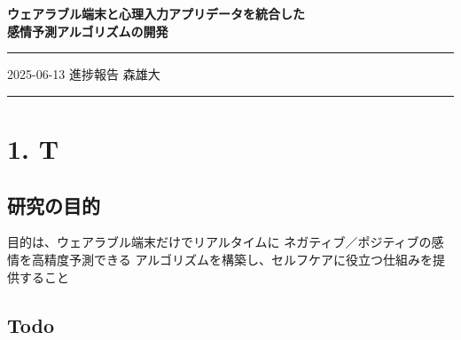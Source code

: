 \documentclass[a4paper,11pt]{article}
\begin{document}
\begin{center}
  {\LARGE \bfseries ウェアラブル端末と心理入力アプリデータを統合した\\感情予測アルゴリズムの開発}\\[6ex]
\end{center}

\hrule\vspace{1ex}
{\normalsize 2025-06-13 進捗報告 \hfill 森雄大}\\
\hrule\vspace{5ex}

\section*{1. T}
\subsection*{研究の目的}
目的は、ウェアラブル端末だけでリアルタイムに  
ネガティブ／ポジティブの感情を高精度予測できる  
アルゴリズムを構築し、セルフケアに役立つ仕組みを提供すること

\subsection*{Todo}




\end{document}
